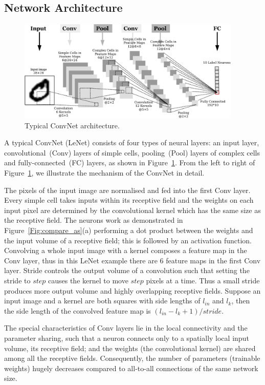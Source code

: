 \subsection{Network Architecture}

	\begin{figure}[bt]
		\centering
		\includegraphics[width=0.95\textwidth]{pics_snn/convnet.pdf}
		\caption{Typical ConvNet architecture.}
		\label{Fig:ConvNet}
	\end{figure}

A typical ConvNet (LeNet) consists of four types of neural layers: an input layer, convolutional~(Conv) layers of simple cells, pooling~(Pool) layers of complex cells and fully-connected~(FC) layers, as shown in Figure~\ref{Fig:ConvNet}.
From the left to right of Figure~\ref{Fig:ConvNet}, we illustrate the mechanism of the ConvNet in detail.

The pixels of the input image are normalised and fed into the first Conv layer.
Every simple cell takes inputs within its receptive field and the weights on each input pixel are determined by the convolutional kernel which has the same size as the receptive field.
The neurons work as demonstrated in Figure~\ref{Fig:compare_as}(a) performing a dot product between the weights and the input volume of a receptive field; this is followed by an activation function.
Convolving a whole input image with a kernel composes a feature map in the Conv layer, thus in this LeNet example there are 6 feature maps in the first Conv layer.
Stride controls the output volume of a convolution such that setting the stride to $step$ causes the kernel to move $step$ pixels at a time.
Thus a small stride produces more output volume and highly overlapping receptive fields.
Suppose an input image and a kernel are both squares with side lengths of $l_{in}$ and $l_k$, then the side length of the convolved feature map is $(l_{in} - l_k + 1)/stride$.

The special characteristics of Conv layers lie in the local connectivity and the parameter sharing, such that a neuron connects only to a spatially local input volume, its receptive field; and the weights (the convolutional kernel) are shared among all the receptive fields.
Consequently, the number of parameters (trainable weights) hugely decreases compared to all-to-all connections of the same network size. 

